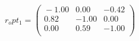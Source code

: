\documentclass[10pt,a4paper]{article}
\begin{document}
 \begin{equation*} r_opt_1  =  %
\begin{pmatrix}{}
  -1.00 & 0.00 & -0.42 \\ 
  0.82 & -1.00 & 0.00 \\ 
  0.00 & 0.59 & -1.00 \\ 
  \end{pmatrix}
 \end{equation*} 
\end{document}
